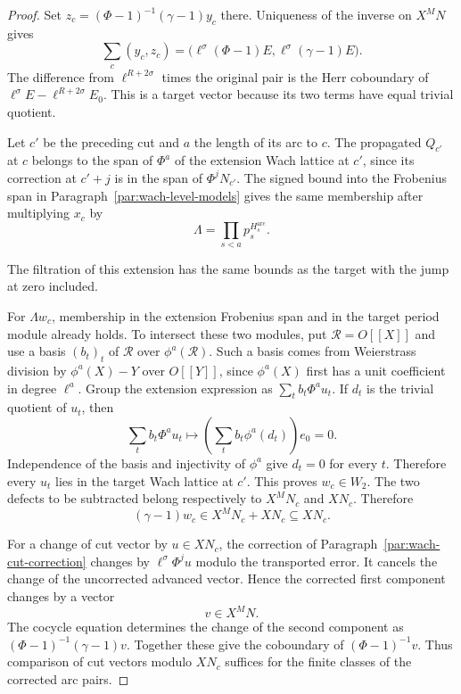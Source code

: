 \begin{proof}
Set \(z_c=(\Phi-1)^{-1}(\gamma-1)y_c\) there.
Uniqueness of the inverse on \(X^MN\) gives
\[
 \sum_c(y_c,z_c)
    =\bigl(\ell^\sigma(\Phi-1)E,\ell^\sigma(\gamma-1)E\bigr).
\]
The difference from \(\ell^{R+2\sigma}\) times the original
pair is the Herr coboundary of
\(\ell^\sigma E-\ell^{R+2\sigma}E_0\). This is a target
vector because its two terms have equal trivial quotient.

Let \(c'\) be the preceding cut and \(a\) the length of its arc
to \(c\). The propagated \(Q_{c'}\) at \(c\) belongs to the span
of \(\Phi^a\) of the extension Wach lattice at \(c'\), since its
correction at \(c'+j\) is in the span of \(\Phi^jN_{c'}\).
The signed bound into the Frobenius span in
Paragraph~\ref{par:wach-level-models} gives the same membership
after multiplying \(x_c\) by
\[
 \Lambda=\prod_{s<a}p_s^{H_s^{\mathrm{arc}}}.
\]

The filtration of this extension has the same bounds as the target
with the jump at zero included.

For \(\Lambda w_c\), membership in the extension Frobenius
span and in the target period module already holds. To
intersect these two modules, put \(\mathcal R=O[[X]]\)
and use a basis \((b_t)_t\) of \(\mathcal R\) over
\(\phi^a(\mathcal R)\). Such a basis comes from Weierstrass
division by \(\phi^a(X)-Y\) over \(O[[Y]]\), since
\(\phi^a(X)\) first has a unit coefficient in degree \(\ell^a\).
Group the extension expression as \(\sum_t b_t\Phi^a u_t\).
If \(d_t\) is the trivial quotient of \(u_t\), then
\[
       \sum_t b_t\Phi^a u_t\longmapsto
                    \left(\sum_t b_t\phi^a(d_t)\right)e_0=0 .
\]
Independence of the basis and injectivity of \(\phi^a\)
give \(d_t=0\) for every \(t\). Therefore every \(u_t\)
lies in the target Wach lattice at \(c'\). This proves
\(w_c\in W_2\). The two defects to be subtracted belong respectively to \(X^MN_c\) and \(XN_c\). Therefore
\[
 (\gamma-1)w_c\in X^M N_c+XN_c\subseteq XN_c.
\]


For a change of cut vector by \(u\in XN_c\), the correction
of Paragraph~\ref{par:wach-cut-correction} changes by
\(\ell^\sigma\Phi^j u\) modulo the transported error.
It cancels the change of the uncorrected advanced vector.
Hence the corrected first component changes by a vector
\[
 v\in X^M N.
\]
The cocycle equation determines the change
of the second component as \((\Phi-1)^{-1}(\gamma-1)v\).
Together these give the coboundary of \((\Phi-1)^{-1}v\).
Thus comparison of cut vectors modulo \(XN_c\) suffices
for the finite classes of the corrected arc pairs.


\end{proof}
